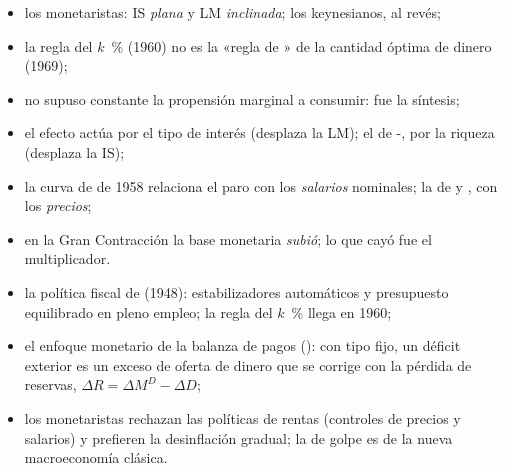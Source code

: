 \documentclass[11pt]{article}
\begin{document}
\begin{itemize}
\begin{itemize}
  \item los monetaristas: IS \emph{plana} y LM \emph{inclinada}; los keynesianos, al revés;
  \item la regla del $k$~\% (1960) no es la «regla de » de la cantidad óptima de dinero (1969);
  \item {} no supuso constante la propensión marginal a consumir: fue la síntesis;
  \item el efecto  actúa por el tipo de interés (desplaza la LM); el de -, por la riqueza (desplaza la IS);
  \item la curva de  de 1958 relaciona el paro con los \emph{salarios} nominales; la de  y , con los \emph{precios};
  \item en la Gran Contracción la base monetaria \emph{subió}; lo que cayó fue el multiplicador.
  \item la política fiscal de  (1948): estabilizadores automáticos y presupuesto equilibrado en pleno empleo; la regla del $k$~\% llega en 1960;
  \item el enfoque monetario de la balanza de pagos (): con tipo fijo, un déficit exterior es un exceso de oferta de dinero que se corrige con la pérdida de reservas, $\Delta R=\Delta M^D-\Delta D$;
  \item los monetaristas rechazan las políticas de rentas (controles de precios y salarios) y prefieren la desinflación gradual; la de golpe es de la nueva macroeconomía clásica.
  \end{itemize}
\end{itemize}

\bibliografia
\end{document}
